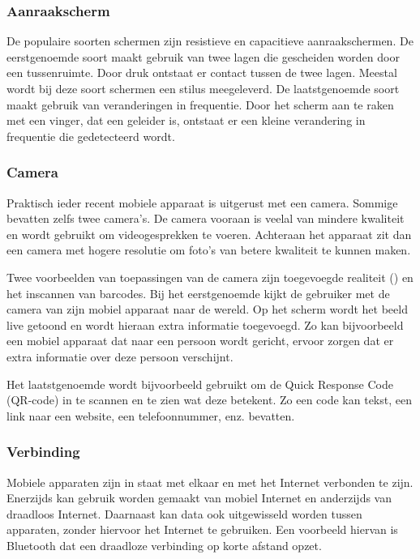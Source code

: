 \subsubsection{Aanraakscherm}
De populaire soorten schermen zijn resistieve en capacitieve aanraakschermen. 
De eerstgenoemde soort maakt gebruik van twee lagen die gescheiden worden door een tussenruimte. 
Door druk ontstaat er contact tussen de twee lagen. 
Meestal wordt bij deze soort schermen een stilus meegeleverd. 
De laatstgenoemde soort maakt gebruik van veranderingen in frequentie. 
Door het scherm aan te raken met een vinger, dat een geleider is, ontstaat er een kleine verandering in frequentie die gedetecteerd wordt. 

\subsubsection{Camera}
Praktisch ieder recent mobiele apparaat is uitgerust met een camera. 
Sommige bevatten zelfs twee camera's. 
De camera vooraan is veelal van mindere kwaliteit en wordt gebruikt om videogesprekken te voeren. 
Achteraan het apparaat zit dan een camera met hogere resolutie om foto's van betere kwaliteit te kunnen maken.

Twee voorbeelden van toepassingen van de camera zijn toegevoegde realiteit () en het inscannen van barcodes.
Bij het eerstgenoemde kijkt de gebruiker met de camera van zijn mobiel apparaat naar de wereld.
Op het scherm wordt het beeld live getoond en wordt hieraan extra informatie toegevoegd.
Zo kan bijvoorbeeld een mobiel apparaat dat naar een persoon wordt gericht, ervoor zorgen dat er extra informatie over deze persoon verschijnt.

Het laatstgenoemde wordt bijvoorbeeld gebruikt om de Quick Response Code (QR-code) in te scannen en te zien wat deze betekent.
Zo een code kan tekst, een link naar een website, een telefoonnummer, enz. bevatten. 

\subsubsection{Verbinding}
Mobiele apparaten zijn in staat met elkaar en met het Internet verbonden te zijn.
Enerzijds kan gebruik worden gemaakt van mobiel Internet en anderzijds van draadloos Internet.
Daarnaast kan data ook uitgewisseld worden tussen apparaten, zonder hiervoor het Internet te gebruiken.
Een voorbeeld hiervan is Bluetooth dat een draadloze verbinding op korte afstand opzet.

